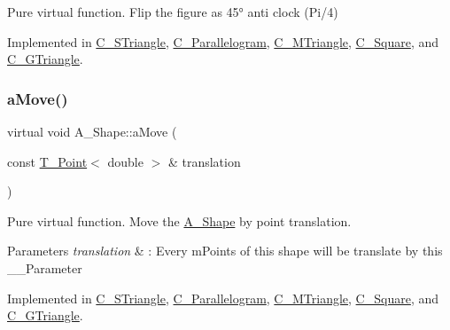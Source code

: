 Pure virtual function. Flip the figure as 45° anti clock (Pi/4) 



Implemented in \hyperlink{classC__STriangle_aff480b9ec706ee5ae58f6f78318e2728}{C\+\_\+\+S\+Triangle}, \hyperlink{classC__Parallelogram_a284a59c9f1c778ac8da80efedc313354}{C\+\_\+\+Parallelogram}, \hyperlink{classC__MTriangle_a3dcac8e1341a79139577deb851a6481e}{C\+\_\+\+M\+Triangle}, \hyperlink{classC__Square_a31d31862502f0ed24e8331af30100338}{C\+\_\+\+Square}, and \hyperlink{classC__GTriangle_a9ffdddb586b42757ffca6a9ca0c20934}{C\+\_\+\+G\+Triangle}.

\mbox{\label{classA__Shape_ab284298db1b557ccfa7ba6de7a5fee2c}} 
\subsubsection{\texorpdfstring{a\+Move()}{aMove()}}
{\footnotesize\ttfamily virtual void A\+\_\+\+Shape\+::a\+Move (\begin{DoxyParamCaption}\item[{const \hyperlink{classT__Point}{T\+\_\+\+Point}$<$ double $>$ \&}]{translation }\end{DoxyParamCaption})\hspace{0.3cm}{\ttfamily [pure virtual]}}



Pure virtual function. Move the \hyperlink{classA__Shape}{A\+\_\+\+Shape} by point translation. 


\begin{DoxyParams}{Parameters}
{\em translation} & \+: Every m\+Points of this shape will be translate by this \+\_\+\+\_\+\+Parameter \\
\hline
\end{DoxyParams}


Implemented in \hyperlink{classC__STriangle_a82a3c3a847ca6c2d5922921150fa50b5}{C\+\_\+\+S\+Triangle}, \hyperlink{classC__Parallelogram_ac77ea776b24c551114d84eaf147f6977}{C\+\_\+\+Parallelogram}, \hyperlink{classC__MTriangle_a4e185345e7e1ffd5c0b7f1f8dfdbdc59}{C\+\_\+\+M\+Triangle}, \hyperlink{classC__Square_a6727523558c58dcd240ec080f254e7c9}{C\+\_\+\+Square}, and \hyperlink{classC__GTriangle_a07789441ce75f81fd4c4649a0115edbe}{C\+\_\+\+G\+Triangle}.

\mbox{\label{classA__Shape_afe2c7969d647f6358da13879a7534ecb}} 
